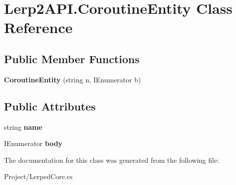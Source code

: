 \hypertarget{class_lerp2_a_p_i_1_1_coroutine_entity}{}\section{Lerp2\+A\+P\+I.\+Coroutine\+Entity Class Reference}
\label{class_lerp2_a_p_i_1_1_coroutine_entity}
\subsection*{Public Member Functions}
\begin{DoxyCompactItemize}
\item 
\mbox{\label{class_lerp2_a_p_i_1_1_coroutine_entity_ab25292f23b6ac11c0308b63dfaa3248d}} 
{\bfseries Coroutine\+Entity} (string n, I\+Enumerator b)
\end{DoxyCompactItemize}
\subsection*{Public Attributes}
\begin{DoxyCompactItemize}
\item 
\mbox{\label{class_lerp2_a_p_i_1_1_coroutine_entity_ad0f1956413a51bfb0f84dc5700e370c5}} 
string {\bfseries name}
\item 
\mbox{\label{class_lerp2_a_p_i_1_1_coroutine_entity_a8222c08002c9acac83565f51135012bb}} 
I\+Enumerator {\bfseries body}
\end{DoxyCompactItemize}


The documentation for this class was generated from the following file\+:\begin{DoxyCompactItemize}
\item 
Project/Lerped\+Core.\+cs\end{DoxyCompactItemize}
